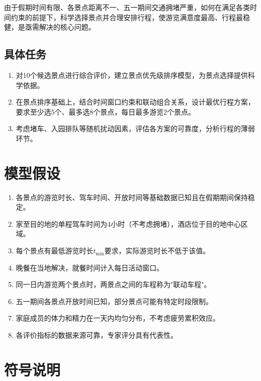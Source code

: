 \documentclass[12pt,a4paper]{ctexart}
\begin{document}
由于假期时间有限、各景点距离不一、五一期间交通拥堵严重，如何在满足各类时间约束的前提下，科学选择景点并合理安排行程，使游览满意度最高、行程最稳健，是亟需解决的核心问题。

\subsection{具体任务}

\begin{enumerate}[label=\textbf{任务\arabic*}：]
    \item 对10个候选景点进行综合评价，建立景点优先级排序模型，为景点选择提供科学依据。
    \item 在景点排序基础上，结合时间窗口约束和联动组合关系，设计最优行程方案，要求至少选5个、最多选8个景点，每日最多游览2个景点。
    \item 考虑堵车、入园排队等随机扰动因素，评估各方案的可靠度，分析行程的薄弱环节。
\end{enumerate}

\section{模型假设}

\begin{enumerate}[label=\textbf{假设\arabic*}：]
    \item 各景点的游览时长、驾车时间、开放时间等基础数据已知且在假期期间保持稳定。
    \item 家至目的地的单程驾车时间为4小时（不考虑拥堵），酒店位于目的地中心区域。
    \item 每个景点有最低游览时长$t_{\min}$要求，实际游览时长不低于该值。
    \item 晚餐在当地解决，就餐时间计入每日活动窗口。
    \item 同一日内游览两个景点时，两景点之间的车程称为"联动车程"。
    \item 五一期间各景点开放时间已知，部分景点可能有特定时段限制。
    \item 家庭成员的体力和精力在一天内均匀分布，不考虑疲劳累积效应。
    \item 各评价指标的数据来源可靠，专家评分具有代表性。
\end{enumerate}

\section{符号说明}
\end{document}
